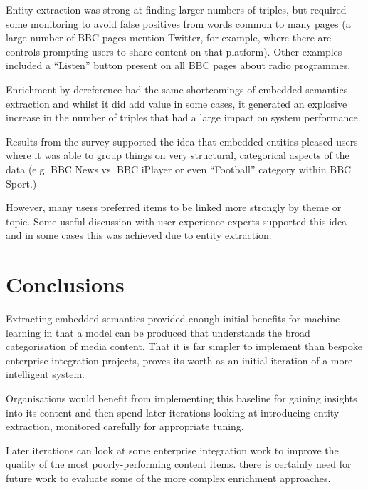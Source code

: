 \documentclass{sig-alternate-05-2015}
\begin{document}
Entity extraction was strong at finding larger numbers of triples, but required
some monitoring to avoid false positives from words common to many pages
(a large number of BBC pages mention Twitter, for example, where there
are controls prompting users to share content on that platform). Other examples
included a ``Listen'' button present on all BBC pages about radio programmes.

Enrichment by dereference had the same shortcomings of embedded semantics
extraction and whilst it did add value in some cases, it generated an explosive
increase in the number of triples that had a large impact on system performance.

Results from the survey supported the idea that embedded entities pleased
users where it was able to group things on very structural, categorical aspects
of the data (e.g. BBC News vs. BBC iPlayer or even ``Football'' category
within BBC Sport.)

However, many users preferred items to be linked more strongly by theme or
topic. Some useful discussion with user experience experts supported this idea
and in some cases this was achieved due to entity extraction.

\section{Conclusions}

Extracting embedded semantics provided enough initial benefits for machine
learning in that a model can be produced that understands the broad categorisation
of media content. That it is far simpler to implement than bespoke enterprise
integration projects, proves its worth as an initial iteration of a more
intelligent system.

Organisations would benefit from implementing this baseline for gaining
insights into its content and then spend later iterations looking at
introducing entity extraction, monitored carefully for appropriate tuning.

Later iterations can look at some enterprise integration work to improve
the quality of the most poorly-performing content items. there is certainly
need for future work to evaluate some of the more complex enrichment approaches.



\end{document}
